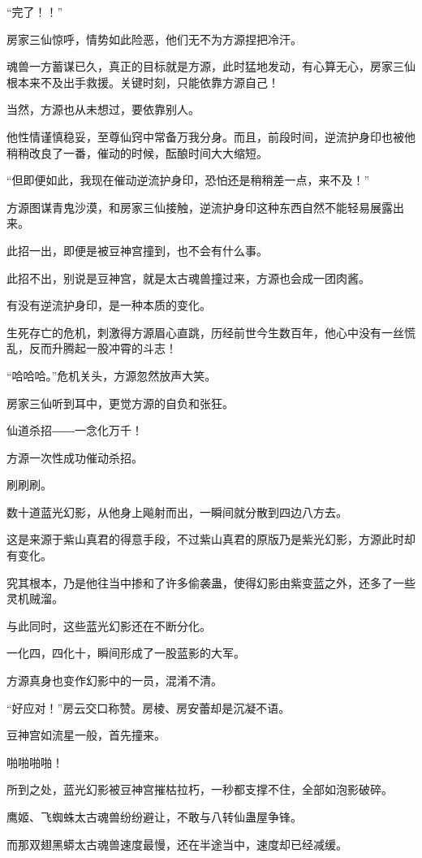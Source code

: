\begin{this_body}
“完了！！”

房家三仙惊呼，情势如此险恶，他们无不为方源捏把冷汗。

魂兽一方蓄谋已久，真正的目标就是方源，此时猛地发动，有心算无心，房家三仙根本来不及出手救援。关键时刻，只能依靠方源自己！

当然，方源也从未想过，要依靠别人。

他性情谨慎稳妥，至尊仙窍中常备万我分身。而且，前段时间，逆流护身印也被他稍稍改良了一番，催动的时候，酝酿时间大大缩短。

“但即便如此，我现在催动逆流护身印，恐怕还是稍稍差一点，来不及！”

方源图谋青鬼沙漠，和房家三仙接触，逆流护身印这种东西自然不能轻易展露出来。

此招一出，即便是被豆神宫撞到，也不会有什么事。

此招不出，别说是豆神宫，就是太古魂兽撞过来，方源也会成一团肉酱。

有没有逆流护身印，是一种本质的变化。

生死存亡的危机，刺激得方源眉心直跳，历经前世今生数百年，他心中没有一丝慌乱，反而升腾起一股冲霄的斗志！

“哈哈哈。”危机关头，方源忽然放声大笑。

房家三仙听到耳中，更觉方源的自负和张狂。

仙道杀招――一念化万千！

方源一次性成功催动杀招。

刷刷刷。

数十道蓝光幻影，从他身上飚射而出，一瞬间就分散到四边八方去。

这是来源于紫山真君的得意手段，不过紫山真君的原版乃是紫光幻影，方源此时却有变化。

究其根本，乃是他往当中掺和了许多偷袭蛊，使得幻影由紫变蓝之外，还多了一些灵机贼溜。

与此同时，这些蓝光幻影还在不断分化。

一化四，四化十，瞬间形成了一股蓝影的大军。

方源真身也变作幻影中的一员，混淆不清。

“好应对！”房云交口称赞。房棱、房安蕾却是沉凝不语。

豆神宫如流星一般，首先撞来。

啪啪啪啪！

所到之处，蓝光幻影被豆神宫摧枯拉朽，一秒都支撑不住，全部如泡影破碎。

鹰姬、飞蜘蛛太古魂兽纷纷避让，不敢与八转仙蛊屋争锋。

而那双翅黑蟒太古魂兽速度最慢，还在半途当中，速度却已经减缓。


\end{this_body}

